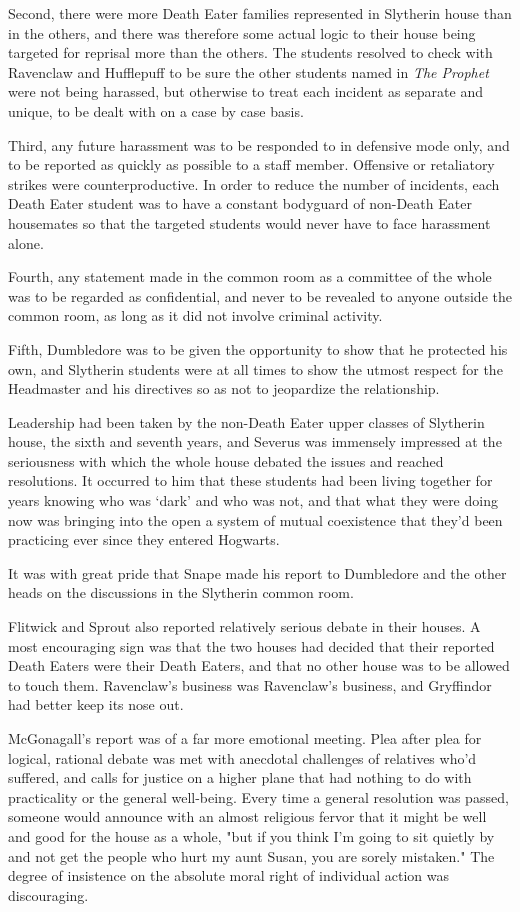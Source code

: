 Second, there were more Death Eater families represented in Slytherin house than in the others, and there was therefore some actual logic to their house being targeted for reprisal more than the others. The students resolved to check with Ravenclaw and Hufflepuff to be sure the other students named in \emph{The Prophet} were not being harassed, but otherwise to treat each incident as separate and unique, to be dealt with on a case by case basis.

Third, any future harassment was to be responded to in defensive mode only, and to be reported as quickly as possible to a staff member. Offensive or retaliatory strikes were counterproductive. In order to reduce the number of incidents, each Death Eater student was to have a constant bodyguard of non-Death Eater housemates so that the targeted students would never have to face harassment alone.

Fourth, any statement made in the common room as a committee of the whole was to be regarded as confidential, and never to be revealed to anyone outside the common room, as long as it did not involve criminal activity.

Fifth, Dumbledore was to be given the opportunity to show that he protected his own, and Slytherin students were at all times to show the utmost respect for the Headmaster and his directives so as not to jeopardize the relationship.

Leadership had been taken by the non-Death Eater upper classes of Slytherin house, the sixth and seventh years, and Severus was immensely impressed at the seriousness with which the whole house debated the issues and reached resolutions. It occurred to him that these students had been living together for years knowing who was `dark' and who was not, and that what they were doing now was bringing into the open a system of mutual coexistence that they'd been practicing ever since they entered Hogwarts.

It was with great pride that Snape made his report to Dumbledore and the other heads on the discussions in the Slytherin common room.

Flitwick and Sprout also reported relatively serious debate in their houses. A most encouraging sign was that the two houses had decided that their reported Death Eaters were their Death Eaters, and that no other house was to be allowed to touch them. Ravenclaw's business was Ravenclaw's business, and Gryffindor had better keep its nose out.

McGonagall's report was of a far more emotional meeting. Plea after plea for logical, rational debate was met with anecdotal challenges of relatives who'd suffered, and calls for justice on a higher plane that had nothing to do with practicality or the general well-being. Every time a general resolution was passed, someone would announce with an almost religious fervor that it might be well and good for the house as a whole, "but if you think I'm going to sit quietly by and not get the people who hurt my aunt Susan, you are sorely mistaken." The degree of insistence on the absolute moral right of individual action was discouraging.

